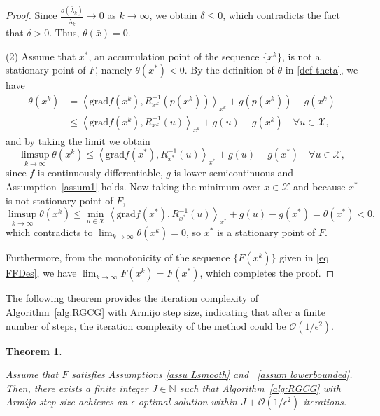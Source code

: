 \documentclass[pdflatex,sn-mathphys-num]{sn-jnl}%
\newtheorem{theorem}{Theorem}[section] %
\theoremstyle{definition} %
\theoremstyle{remark} %
\newcommand{\grad}{\mathrm{grad}}
\begin{document}
\begin{proof}
        \noindent Since $\frac{o(\bar{\lambda}_k)}{\bar{\lambda}_k} \to 0$ as $k \to \infty$, we obtain $\delta \leq0$, which contradicts the fact that $\delta>0$. Thus, $\theta\left(\bar{x}\right)=0$. 



        
        (2) 
        Assume that \( x^* \),  an accumulation point of the sequence \(\{x^k\}\), is not a stationary point of $F$, namely \(\theta\left(x^*\right)<0\). By the definition of \(\theta\) in \eqref{def theta}, we have
        \begin{align*}
            \theta\left(x^k\right) &= \left\langle \grad f(x^k), R^{-1}_{x^k}(p(x^k)) \right\rangle_{x^k} + g(p(x^k)) - g(x^k)\\
            &\leq \left\langle \grad f(x^k), R^{-1}_{x^k}(u) \right\rangle_{x^k} + g(u) - g(x^k) \quad \forall u \in \mathcal{X},
        \end{align*}
        and by taking the limit we obtain
        $$
        \limsup_{k \rightarrow \infty} \theta\left(x^k\right) \leq \left\langle \grad f(x^*), R^{-1}_{x^*}(u) \right\rangle_{x^*} + g(u) - g(x^*) \quad \forall u \in \mathcal{X},
        $$
        since $f$ is continuously differentiable, $g$ is lower semicontinuous and Assumption~\ref{assum1} holds.
        Now taking the minimum over $x\in \mathcal{X}$ and because \( x^* \) is not stationary point of $F$, 
        $$
        \limsup_{k \rightarrow \infty} \theta\left(x^k\right) \leq \min_{u \in \mathcal{X}} \left\langle \grad f(x^*), R^{-1}_{x^*}(u) \right\rangle_{x^*} + g(u) - g(x^*)=\theta\left(x^*\right)<0,
        $$
        which contradicts to $\lim _{k \rightarrow \infty} \theta(x^k)=0$, 
        so \( x^* \) is a stationary point of $F$.
        
        Furthermore, from the monotonicity of the sequence $\{F(x^k)\}$ given in \eqref{eq FFDes}, we have $\lim _{k \rightarrow \infty} F(x^k)=F\left(x^*\right)$, which completes the proof.
    \end{proof}

The following theorem provides the iteration complexity of Algorithm~\ref{alg:RGCG} with Armijo step size, indicating that after a finite number of steps, the iteration complexity of the method could be $\mathcal{O} \left( 1/\epsilon^2 \right)$.

    \begin{theorem}\label{thm armijo2}

        Assume that  $F$  satisfies Assumptions \ref{assu Lsmooth} and ~\ref{assum lowerbounded}. Then, there exists a finite integer $J\in \mathbb{N}$ such that Algorithm~\ref{alg:RGCG} with Armijo step size achieves an $\epsilon$-optimal solution within  $J + \mathcal{O} \left( 1/\epsilon^2 \right)$  iterations.

        
    \end{theorem}
\end{document}
